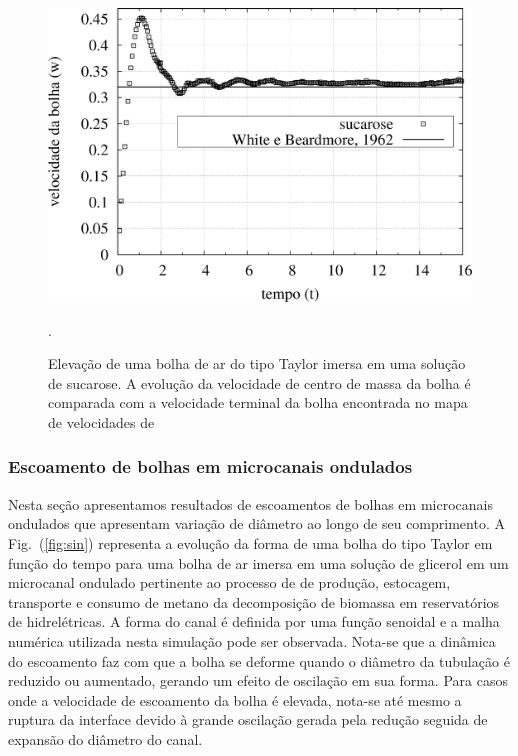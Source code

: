 \documentclass[a4paper,portuges,12pt]{article}
\begin{document}
 \begin{figure}[h]
 	\begin{center}
 		\includegraphics[angle=0, scale=0.5]{figs/sucrose.pdf}
 	\end{center}
	\caption{Elevação de uma bolha de ar do tipo Taylor imersa em uma
	solução de sucarose. A evolução da velocidade de centro de massa da
	bolha é comparada com a velocidade terminal da bolha encontrada no
	mapa de velocidades de \cite{white1962}}.
   \label{fig:sucroseVel}
 \end{figure}

\subsubsection{Escoamento de bolhas em microcanais ondulados}

Nesta seção apresentamos resultados de escoamentos de bolhas em
microcanais ondulados que apresentam variação de diâmetro ao longo de
seu comprimento.  A Fig.~(\ref{fig:sin}) representa a evolução da forma
de uma bolha do tipo Taylor em função do tempo para uma bolha de ar
imersa em uma solução de glicerol em um microcanal ondulado pertinente
ao processo de de produção, estocagem, transporte e consumo de metano da
decomposição de biomassa em reservatórios de hidrelétricas. A forma do
canal é definida por uma função senoidal e a malha numérica utilizada
nesta simulação pode ser observada. Nota-se que a dinâmica do escoamento
faz com que a bolha se deforme quando o diâmetro da tubulação é reduzido
ou aumentado, gerando um efeito de oscilação em sua forma. Para casos
onde a velocidade de escoamento da bolha é elevada, nota-se até mesmo a
ruptura da interface devido à grande oscilação gerada pela redução
seguida de expansão do diâmetro do canal.
\end{document}
